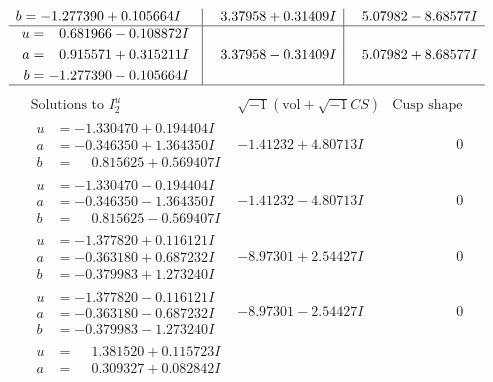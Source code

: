 \documentclass[1p]{elsarticle_modified}
\theoremstyle{definition}
\newcommand{\I}{\sqrt{-1}}
\begin{document}
$$\begin{array}{c|c|c}
\begin{aligned}
b &= -1.277390 + 0.105664 I\end{aligned}
 & \phantom{-}3.37958 + 0.31409 I & \phantom{-}5.07982 - 8.68577 I \\ \hline\begin{aligned}
u &= \phantom{-}0.681966 - 0.108872 I \\
a &= \phantom{-}0.915571 + 0.315211 I \\
b &= -1.277390 - 0.105664 I\end{aligned}
 & \phantom{-}3.37958 - 0.31409 I & \phantom{-}5.07982 + 8.68577 I\\
 \hline 
 \end{array}$$\newpage$$\begin{array}{c|c|c}  
\text{Solutions to }I^u_{2}& \I (\text{vol} + \sqrt{-1}CS) & \text{Cusp shape}\\
 \hline 
\begin{aligned}
u &= -1.330470 + 0.194404 I \\
a &= -0.346350 + 1.364350 I \\
b &= \phantom{-}0.815625 + 0.569407 I\end{aligned}
 & -1.41232 + 4.80713 I & \phantom{-0.000000 } 0 \\ \hline\begin{aligned}
u &= -1.330470 - 0.194404 I \\
a &= -0.346350 - 1.364350 I \\
b &= \phantom{-}0.815625 - 0.569407 I\end{aligned}
 & -1.41232 - 4.80713 I & \phantom{-0.000000 } 0 \\ \hline\begin{aligned}
u &= -1.377820 + 0.116121 I \\
a &= -0.363180 + 0.687232 I \\
b &= -0.379983 + 1.273240 I\end{aligned}
 & -8.97301 + 2.54427 I & \phantom{-0.000000 } 0 \\ \hline\begin{aligned}
u &= -1.377820 - 0.116121 I \\
a &= -0.363180 - 0.687232 I \\
b &= -0.379983 - 1.273240 I\end{aligned}
 & -8.97301 - 2.54427 I & \phantom{-0.000000 } 0 \\ \hline\begin{aligned}
u &= \phantom{-}1.381520 + 0.115723 I \\
a &= \phantom{-}0.309327 + 0.082842 I \\

\end{aligned}
\end{array}$$
\end{document}
